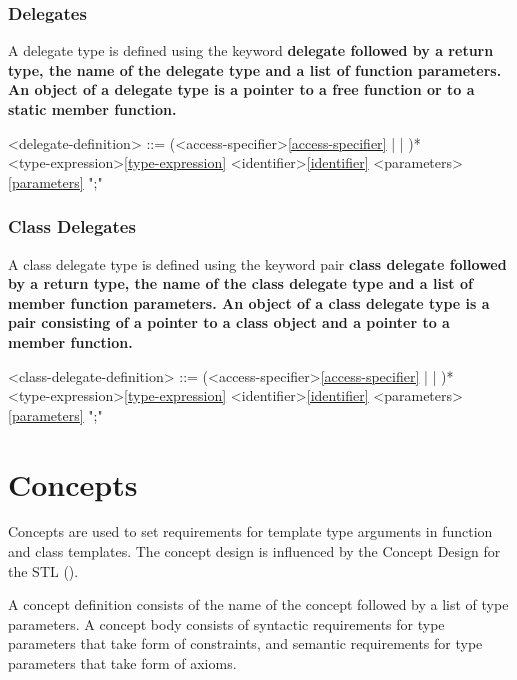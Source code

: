 \documentclass[a4paper,oneside,11pt]{article}
\begin{document}
\subsubsection{Delegates}

A delegate type is defined using the keyword \bf{delegate} followed by a return type, the name of the delegate type and a
list of function parameters.
An object of a delegate type is a pointer to a free function or to a static member function.

\begin{grammar}
\label{delegate-definition}<delegate-definition> ::= (<access-specifier>\ref{access-specifier} |  | )* \\
<type-expression>\ref{type-expression} <identifier>\ref{identifier} <parameters>\ref{parameters} ";"
\end{grammar}

\subsubsection{Class Delegates}

A class delegate type is defined using the keyword pair \bf{class} \bf{delegate} followed by a return type, the name of the
class delegate type and a list of member function parameters.
An object of a class delegate type is a pair consisting of a pointer to a class object and a pointer to a member function.

\begin{grammar}
\label{class-delegate-definition}<class-delegate-definition> ::= (<access-specifier>\ref{access-specifier} |  | )*  \\
<type-expression>\ref{type-expression} <identifier>\ref{identifier} <parameters>\ref{parameters} ";"
\end{grammar}

\section{Concepts}

Concepts are used to set requirements for template type arguments in function and class templates.
The concept design is influenced by the Concept Design for the STL (\cite{STLCONCEPTS}).

A concept definition consists of the name of the concept followed by a list of type parameters.
A concept body consists of syntactic requirements for type parameters that take form of constraints,
and semantic requirements for type parameters that take form of axioms.
\end{document}
